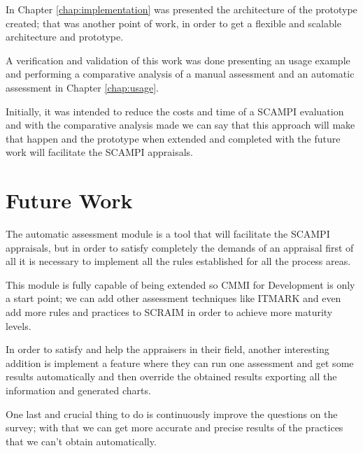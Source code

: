 In Chapter \ref{chap:implementation} was presented the architecture of the prototype created; that was another point of work, in order to get a flexible and scalable architecture and prototype.

A verification and validation of this work was done presenting an usage example and performing a comparative analysis of a manual assessment and an automatic assessment in Chapter \ref{chap:usage}. 

Initially, it was intended to reduce the costs and time of a SCAMPI evaluation and with the comparative analysis made we can say that this approach will make that happen and the prototype when extended and completed with the future work will facilitate the SCAMPI appraisals.

\section{Future Work}\label{futurework}

The automatic assessment module is a tool that will facilitate the SCAMPI appraisals, but in order to satisfy completely the demands of an appraisal first of all it is necessary to implement all the rules established for all the process areas.

This module is fully capable of being extended so CMMI for Development is only a start point; we can add other assessment techniques like ITMARK and even add more rules and practices to SCRAIM in order to achieve more maturity levels.

In order to satisfy and help the appraisers in their field, another interesting addition is implement a feature where they can run one assessment and get some results automatically and then override the obtained results exporting all the information and generated charts.

One last and crucial thing to do is continuously improve the questions on the survey; with that we can get more accurate and precise results of the practices that we can't obtain automatically. 